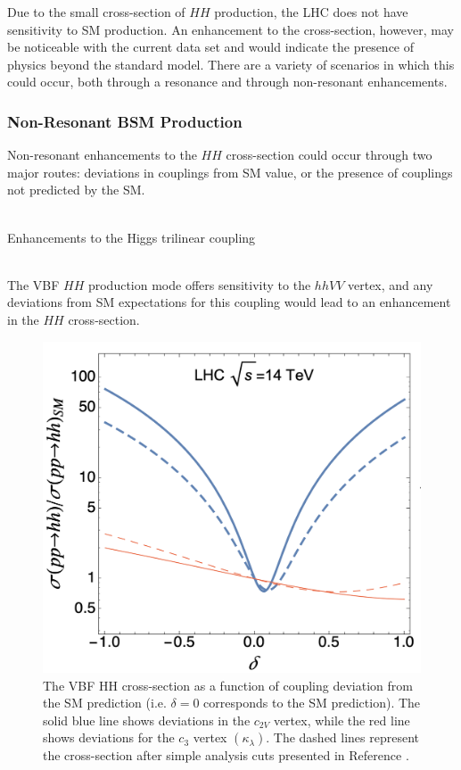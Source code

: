 Due to the small cross-section of $HH$ production, the LHC does not have sensitivity to \gls{SM} production. An enhancement to the cross-section, however, may be noticeable with the current data set and would indicate the presence of physics beyond the standard model. There are a variety of scenarios in which this could occur, both through a resonance and through non-resonant enhancements.

\subsubsection{Non-Resonant BSM Production}

Non-resonant enhancements to the $HH$ cross-section could occur through two major routes: deviations in couplings from \gls{SM} value, or the presence of couplings not predicted by the \gls{SM}.

\noindent{${\boldsymbol \kappa_{\lambda}}$}\\
\indent Enhancements to the Higgs trilinear coupling

\\
\indent The \gls{VBF} $HH$ production mode offers sensitivity to the $hhVV$ vertex, and any deviations from \gls{SM} expectations for this coupling would lead to an enhancement in the $HH$ cross-section.


\begin{figure}[!ht]
    \centering
    \includegraphics[width=.7\textwidth]{chapters/chapter1_theory/images/coupling_xsec.png}
    \caption[The VBF HH cross-section as a function of coupling deviation from the \gls{SM} prediction.]{The VBF HH cross-section as a function of coupling deviation from the \gls{SM} prediction (i.e. $\delta=0$ corresponds to the \gls{SM} prediction). The solid blue line shows deviations in the $c_{2V}$ vertex, while the red line shows deviations for the $c_{3}$ vertex $(\kappa_\lambda)$. The dashed lines represent the cross-section after simple analysis cuts presented in Reference \cite{vbfhh}.}
    \label{fig:c2v-xsec}
\end{figure}



